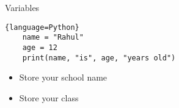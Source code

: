\begin{frame}[fragile]{Variables}
	\begin{lstlisting}{language=Python}
    name = "Rahul"
    age = 12
    print(name, "is", age, "years old")
    \end{lstlisting}
    \pause
	\begin{itemize}
		\item Store your school name
		\item Store your class
	\end{itemize}
\end{frame}
